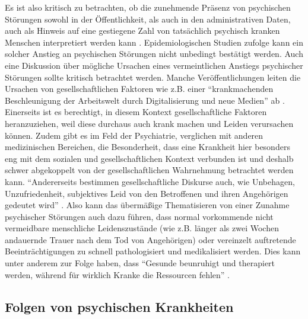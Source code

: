Es ist also kritisch zu betrachten, ob die zunehmende Präsenz von psychischen Störungen sowohl in der Öffentlichkeit, als auch in den administrativen Daten, auch als Hinweis auf eine gestiegene Zahl von tatsächlich psychisch kranken Menschen interpretiert werden kann \parencite{wagner2021psychische}. %
Epidemiologischen Studien zufolge kann ein solcher Anstieg an psychischen Störungen nicht unbedingt bestätigt werden. Auch eine Diskussion über mögliche Ursachen eines vermeintlichen Anstiegs psychischer Störungen sollte kritisch betrachtet werden.
Manche Veröffentlichungen leiten die Ursachen von gesellschaftlichen Faktoren wie z.B. einer “krankmachenden Beschleunigung der Arbeitswelt durch Digitalisierung und neue Medien” ab \cite[S. 6]{wagner2021psychische}. %
Einerseits ist es berechtigt, in diesem Kontext gesellschaftliche Faktoren heranzuziehen, weil diese durchaus auch krank machen und Leiden verursachen können. Zudem gibt es im Feld der Psychiatrie, verglichen mit anderen medizinischen Bereichen, die Besonderheit, dass eine Krankheit hier besonders eng mit dem sozialen und gesellschaftlichen Kontext verbunden ist und deshalb schwer abgekoppelt von der gesellschaftlichen Wahrnehmung betrachtet werden kann. “Andererseits bestimmen gesellschaftliche Diskurse auch, wie Unbehagen, Unzufriedenheit, subjektives Leid von den Betroffenen und ihren Angehörigen gedeutet wird” \cite[S. 6]{wagner2021psychische}. %
Also kann das übermäßige Thematisieren von einer Zunahme psychischer Störungen auch dazu führen, dass normal vorkommende nicht vermeidbare menschliche Leidenszustände (wie z.B. länger als zwei Wochen andauernde Trauer nach dem Tod von Angehörigen) oder vereinzelt auftretende Beeinträchtigungen zu schnell pathologisiert und medikalisiert werden. Dies kann unter anderem zur Folge haben, dass “Gesunde beunruhigt und therapiert werden, während für wirklich Kranke die Ressourcen fehlen” \cite[S. 11]{wagner2021psychische}. %


\subsection{Folgen von psychischen Krankheiten}\label{subsubsec:folgen_psychischer_krankheiten}



